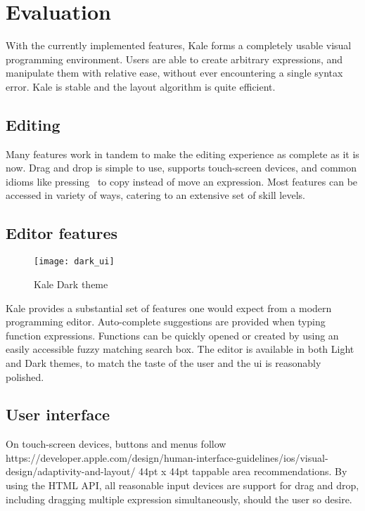 \chapter{Evaluation}

With the currently implemented features, Kale forms a completely
usable visual programming environment. Users are able to create
arbitrary expressions, and manipulate them with relative ease, without
ever encountering a single syntax error. Kale is stable and the layout
algorithm is quite efficient.

\section{Editing}
Many features work in tandem to make the editing experience as complete as it
is now. Drag and drop is simple to use, supports touch-screen devices, and
common idioms like pressing~\keys{\ctrl} to copy instead of move an expression.
Most features can be accessed in variety of ways, catering to an extensive
set of skill levels. %


\section{Editor features}
\begin{wrapfigure}[11]{r}{8cm}
\texttt{[image: dark\_ui]}	
\caption{Kale Dark theme}
\end{wrapfigure}

Kale provides a substantial set of features one would expect from a modern
programming editor. Auto-complete suggestions are provided when typing
function expressions. Functions can be quickly opened or created by using an
easily accessible fuzzy matching search box. The editor is available in both
Light and Dark themes, to match the taste of the user and the \ac{ui} is
reasonably polished.

\section{User interface}
On touch-screen devices, buttons and menus follow
{https://developer.apple.com/design/human-interface-guidelines/ios/visual-design/adaptivity-and-layout/}
44pt x 44pt tappable area recommendations. By using the HTML
 API,
all reasonable input devices are support for drag and drop, including dragging
multiple expression simultaneously, should the user so desire.

